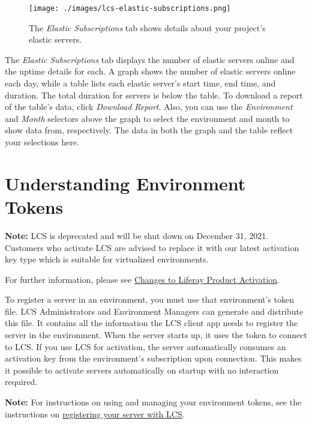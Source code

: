 \begin{figure}
\centering
\texttt{[image: ./images/lcs-elastic-subscriptions.png]}
\caption{The \emph{Elastic Subscriptions} tab shows details about your
project's elastic servers.}
\end{figure}

The \emph{Elastic Subscriptions} tab displays the number of elastic
servers online and the uptime details for each. A graph shows the number
of elastic servers online each day, while a table lists each elastic
server's start time, end time, and duration. The total duration for
servers is below the table. To download a report of the table's data,
click \emph{Download Report}. Also, you can use the \emph{Environment}
and \emph{Month} selectors above the graph to select the environment and
month to show data from, respectively. The data in both the graph and
the table reflect your selections here.

\chapter{Understanding Environment
Tokens}\label{understanding-environment-tokens}

\noindent\hrulefill

\textbf{Note:} LCS is deprecated and will be shut down on December 31,
2021. Customers who activate LCS are advised to replace it with our
latest activation key type which is suitable for virtualized
environments.

For further information, please see
\href{https://help.liferay.com/hc/en-us/articles/4402347960845-Changes-to-Liferay-Product-Activation}{Changes
to Liferay Product Activation}.

\noindent\hrulefill

To register a server in an environment, you must use that environment's
token file. LCS Administrators and Environment Managers can generate and
distribute this file. It contains all the information the LCS client app
needs to register the server in the environment. When the server starts
up, it uses the token to connect to LCS. If you use LCS for activation,
the server automatically consumes an activation key from the
environment's subscription upon connection. This makes it possible to
activate servers automatically on startup with no interaction required.

\noindent\hrulefill

\textbf{Note:} For instructions on using and managing your environment
tokens, see the instructions on
\href{/docs/7-2/deploy/-/knowledge_base/d/activating-your-liferay-dxp-server-with-lcs}{registering
your server with LCS}.

